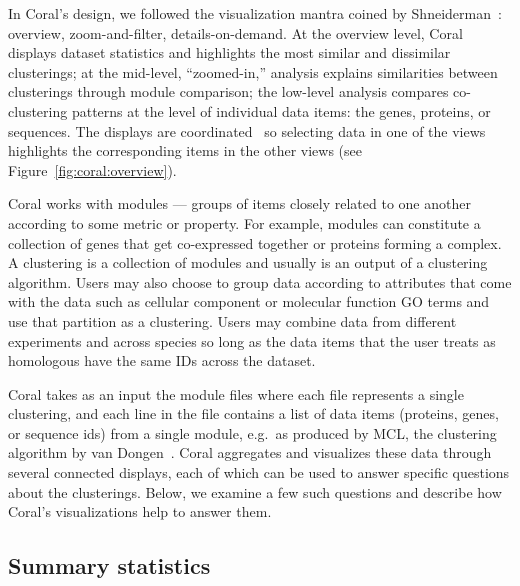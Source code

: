 \documentclass[12pt]{cmuthesis}
\makeatletter
\newcommand\Coral{Coral\xspace}
\newcommand{\eg}{e.g.\@}
\makeatother
\begin{document}
  In \Coral's design, we followed the visualization mantra coined by Shneiderman~\cite{Shneiderman1996}: overview, zoom-and-filter, details-on-demand. At the overview level, \Coral displays dataset statistics and highlights the most similar and dissimilar clusterings; at the mid-level, ``zoomed-in,'' analysis explains similarities between clusterings through module comparison; the low-level analysis compares co-clustering patterns at the level of individual data items: the genes, proteins, or sequences. The displays are coordinated~\cite{North2000} so selecting data in one of the views highlights the corresponding items in the other views (see Figure~\ref{fig:coral:overview}).


  Coral works with modules --- groups of items closely related to one another according to some metric or property. For example, modules can constitute a collection of genes that get co-expressed together or proteins forming a complex. A clustering is a collection of modules and usually is an output of a clustering algorithm. Users may also choose to group data according to attributes that come with the data such as cellular component or molecular function GO terms and use that partition as a clustering. Users may combine data from different experiments and across species so long as the data items that the user treats as homologous have the same IDs across the dataset.



  \Coral takes as an input the module files where each file represents a single clustering, and each line in the file contains a list of data items (proteins, genes, or sequence ids) from a single module, \eg~as produced by MCL, the clustering algorithm by van Dongen~\cite{VanDongen2000}. \Coral aggregates and visualizes these data through several connected displays, each of which can be used to answer specific questions about the clusterings. Below, we examine a few such questions and describe how \Coral's visualizations help to answer them.


  \subsection{Summary statistics}
\end{document}
